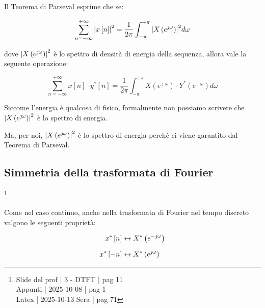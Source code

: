Il Teorema di Parseval esprime che se: 

{
    \Large 
    \begin{equation}
        \sum_{n = -\infty}^{+ \infty} 
        \abs{x \left[ n\right]}^{2}
        = 
        \dfrac{1}{2 \pi} 
        \int_{-\pi}^{+ \pi} 
        \abs{X \left( e^{\jmath \omega}\right)}^{2}
        d\omega
    \end{equation}
}

dove $\abs{X \left( e^{\jmath \omega}\right)}^{2}$ è lo spettro di densità di energia della sequenza, 
allora vale la seguente operazione: 

{
    \Large 
    \begin{equation}
        \sum_{n = - \infty}^{+ \infty}
        x \left[ n\right]
        \cdot 
        y^{*} \left[n \right]
        = 
        \dfrac{1}{2 \pi}
        \int_{- \pi}^{+ \pi}
        X \left(e^{\jmath \omega}\right)
        \cdot 
        Y^{*} \left(e^{\jmath \omega}\right) 
        d\omega
    \end{equation}
}

\begin{tcolorbox}
Siccome l'energia è qualcosa di fisico, 
formalmente non possiamo scrivere che $\abs{X \left( e^{\jmath \omega}\right)}^{2}$ è lo spettro di energia. \newline 

Ma, per noi, $\abs{X \left( e^{\jmath \omega}\right)}^{2}$ è lo spettro di energia perchè ci viene garantito dal Teorema di Parseval.
\end{tcolorbox}

\newpage 

\subsection{Simmetria della trasformata di Fourier} \label{subsec: Simmetria della trasformata di Fourier}

\footnote{ 
    Slide del prof | 3 - DTFT | pag 11\\
    Appunti | 2025-10-08 | pag 1 \\ 
    Latex | 2025-10-13 Sera | pag 71
} 

Come nel caso continuo, anche nella trasformata di Fourier nel tempo discreto valgono le seguenti proprietà: 

{
    \Large 
    \begin{equation}
        \setlength{\jot}{10pt} %
        \begin{split}
            x^{*} \left[ n \right]
            &\leftrightarrow 
            X^{*} \left( e^{-\jmath \omega}\right)
            \\
            x^{*} \left[ -n \right]
            &\leftrightarrow 
            X^{*} \left( e^{\jmath \omega}\right)
        \end{split}
    \end{equation}
}


